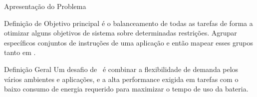       \begin{frame}{Apresentação do Problema}
      
         \begin{block}{Definição de \cite{Hidalgo1997}}
            Objetivo principal é o balanceamento de todas as tarefas de forma a otimizar alguns objetivos de sistema sobre determinadas restrições.
	         Agrupar específicos conjuntos de instruções de uma aplicação e então mapear esses grupos tanto em \hs.
         \end{block}
         
            \bigskip

         \begin{block}{Definição Geral}
            Um desafio de \design\ é combinar a flexibilidade de demanda pelos vários ambientes e aplicações, e a alta performance exigida em tarefas com o baixo consumo de energia requerido para maximizar o tempo de uso da bateria.
         \end{block}

      \end{frame}
      
      
